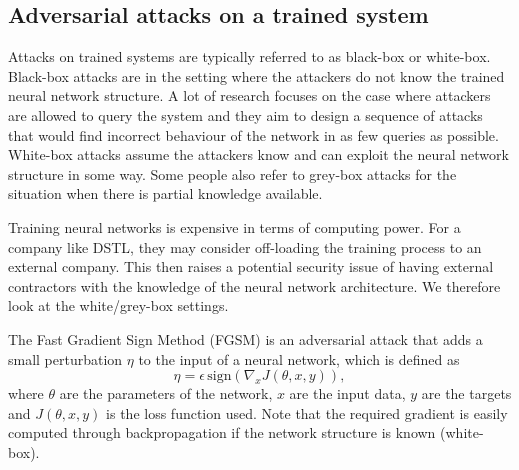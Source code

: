 \subsection{Adversarial attacks on a trained system}

Attacks on trained systems are typically referred to as black-box or white-box. Black-box attacks are in the setting where the attackers do not know the trained neural network structure. A lot of research focuses on the case where attackers are allowed to query the system and they aim to design a sequence of attacks that would find incorrect behaviour of the network in as few queries as possible. White-box attacks assume the attackers know and can exploit the neural network structure in some way. Some people also refer to grey-box attacks for the situation when there is partial knowledge available.

Training neural networks is expensive in terms of computing power. For a company like DSTL, they may consider off-loading the training process to an external company. This then raises a potential security issue of having external contractors with the knowledge of the neural network architecture. We therefore look at the white/grey-box settings.

The Fast Gradient Sign Method (FGSM) \cite{Goodfellow14} is an adversarial attack that adds a small perturbation \(\eta\) to the input of a neural network, which is defined as
\begin{equation}
\eta = \epsilon \, \text{sign}(\nabla_x J(\theta,x,y)),\label{eq:fgsm}
\end{equation}
where \(\theta\) are the parameters of the network, \(x\) are the input data, \(y\) are the targets and \(J(\theta,x,y)\) is the loss function used. Note that the required gradient is easily computed through backpropagation if the network structure is known (white-box).

